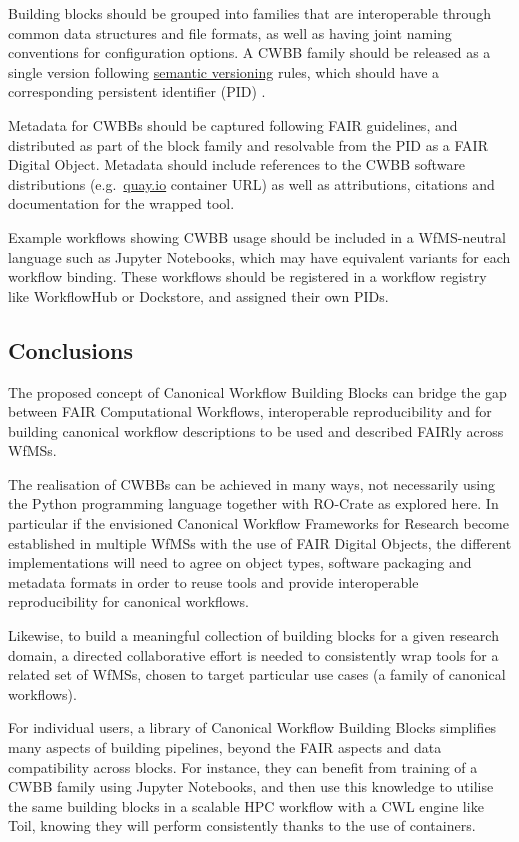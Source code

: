 Building blocks should be grouped into families that are interoperable
through common data structures and file formats, as well as having joint
naming conventions for configuration options. A CWBB family should be
released as a single version following
\href{https://semver.org/spec/v2.0.0.html}{semantic versioning} rules,
which should have a corresponding persistent identifier (PID) \cite{McMurry 2017}.

Metadata for CWBBs should be captured following FAIR guidelines, and
distributed as part of the block family and resolvable from the PID as a
FAIR Digital Object. Metadata should include references to the CWBB
software distributions (e.g.~\href{https://quay.io/search}{quay.io}
container URL) as well as attributions, citations and documentation for
the wrapped tool.

Example workflows showing CWBB usage should be included in a
WfMS-neutral language such as Jupyter Notebooks, which may have
equivalent variants for each workflow binding. These workflows should be
registered in a workflow registry like WorkflowHub or Dockstore, and
assigned their own PIDs.

\subsection{Conclusions}\label{conclusions}

The proposed concept of Canonical Workflow Building Blocks can bridge
the gap between FAIR Computational Workflows, interoperable
reproducibility and for building canonical workflow descriptions to be
used and described FAIRly across WfMSs.

The realisation of CWBBs can be achieved in many ways, not necessarily
using the Python programming language together with RO-Crate as explored
here. In particular if the envisioned Canonical Workflow Frameworks for
Research become established in multiple WfMSs with the use of FAIR
Digital Objects, the different implementations will need to agree on
object types, software packaging and metadata formats in order to reuse
tools and provide interoperable reproducibility for canonical workflows.

Likewise, to build a meaningful collection of building blocks for a
given research domain, a directed collaborative effort is needed to
consistently wrap tools for a related set of WfMSs, chosen to target
particular use cases (a family of canonical workflows).

For individual users, a library of Canonical Workflow Building Blocks
simplifies many aspects of building pipelines, beyond the FAIR aspects
and data compatibility across blocks. For instance, they can benefit
from training of a CWBB family using Jupyter Notebooks, and then use
this knowledge to utilise the same building blocks in a scalable HPC
workflow with a CWL engine like Toil, knowing they will perform
consistently thanks to the use of containers.


